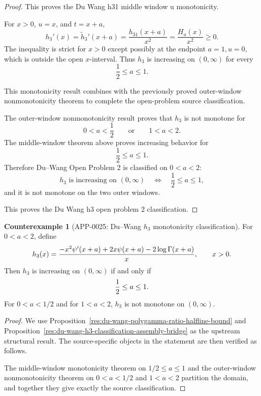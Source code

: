 \documentclass[11pt]{article}
\numberwithin{equation}{section}
\theoremstyle{definition}
\newtheorem{counterexample}[theorem]{Counterexample}
\theoremstyle{remark}
\newcommand{\1}{\mathbf 1}
\begin{document}
\begin{proof}
This proves the Du Wang h31 middle window u monotonicity.

For \(x>0\), \(u=x\), and \(t=x+a\),
\[
h_3'(x)=\widetilde h_3'(x+a)=\frac{h_{31}(x+a)}{x^2}
=\frac{H_a(x)}{x^2}\ge0.
\]
The inequality is strict for \(x>0\) except possibly at the endpoint
\(a=1,u=0\), which is outside the open \(x\)-interval.  Thus \(h_3\) is
increasing on \((0,\infty)\) for every
\[
\frac12\le a\le1.
\]

This monotonicity result combines with the previously proved outer-window nonmonotonicity theorem to complete the open-problem source classification.

The outer-window nonmonotonicity result proves that \(h_3\) is not monotone for
\[
0<a<\frac12
\qquad\text{or}\qquad
1<a<2.
\]
The middle-window theorem above proves increasing behavior for
\[
\frac12\le a\le1.
\]
Therefore Du--Wang Open Problem 2 is classified on \(0<a<2\):
\[
h_3 \text{ is increasing on }(0,\infty)
\quad\Longleftrightarrow\quad
\frac12\le a\le1,
\]
and it is not monotone on the two outer windows.

This proves the Du Wang h3 open problem 2 classification.
\end{proof}

\begin{counterexample}[APP-0025: Du--Wang \(h_3\) monotonicity classification]
\label{thm:app25-du-wang-h3}
For \(0<a<2\), define
\[
 h_3(x)=
 {-x^2\psi'(x+a)+2x\psi(x+a)-2\log\Gamma(x+a)\over x},
 \qquad x>0 .
\]
Then \(h_3\) is increasing on \((0,\infty)\) if and only if
\[
  {1\over2}\le a\le1 .
\]
For \(0<a<1/2\) and for \(1<a<2\), \(h_3\) is not monotone on
\((0,\infty)\).


\end{counterexample}

\begin{proof}
We use Proposition~\ref{res:du-wang-polygamma-ratio-halfline-bound} and Proposition~\ref{res:du-wang-h3-classification-assembly-bridge} as the upstream structural result. The source-specific objects in the statement are then verified as follows.

The middle-window monotonicity theorem on \(1/2\le a\le1\) and the outer-window nonmonotonicity theorem on \(0<a<1/2\) and \(1<a<2\) partition the domain, and together they give exactly the source classification.
\end{proof}
\end{document}
